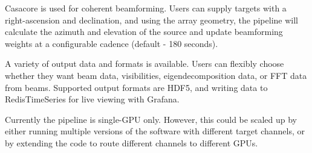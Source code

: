\documentclass{pas}
\begin{document}
Casacore is used for coherent beamforming. Users can supply targets with a 
right-ascension and declination, and using the array geometry, the pipeline will
calculate the azimuth and elevation of the source and update beamforming weights 
at a configurable cadence (default - 180 seconds).

A variety of output data and formats is available. Users can flexibly choose
whether they want beam data, visibilities, eigendecomposition data, or FFT data
from beams. Supported output formats are HDF5, and writing data to
RedisTimeSeries for live viewing with Grafana.

Currently the pipeline is single-GPU only. However, this could be scaled up by
either running multiple versions of the software with different target
channels, or by extending the code to route different channels to different
GPUs.
\end{document}
